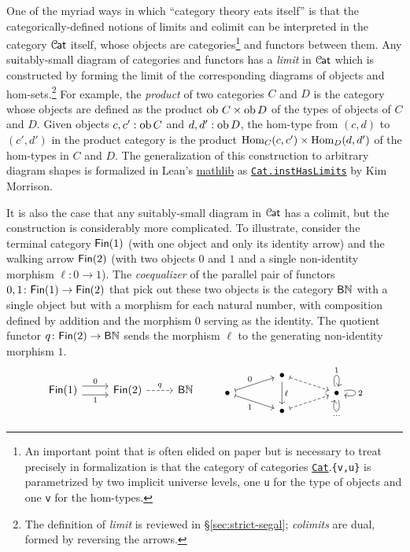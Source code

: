 \documentclass[a4paper,UKenglish,cleveref, autoref, thm-restate]{lipics-v2021}
\newcommand{\ob}{\textup{ob}}
\newcommand{\Hom}{\textup{Hom}}
\newcommand{\cat}[1]{\textup{\textsf{#1}}}%
\newcommand{\NN}{\mathbb{N}}
\newcommand{\1}{\mathbbe{1}}
\newcommand{\2}{\mathbbe{2}}
\newcommand{\3}{\mathbbe{3}}
\newcommand{\Fin}{\cat{Fin}}
\newcommand{\Cat}{\mathcal{C}{\kern-.75pt}\cat{at}}
\newcommand{\libmathlib}{\href{https://github.com/leanprover-community/mathlib}{\textsf{mathlib}}}
\newcommand{\cdoc}[2][]{\href{https://leanprover-community.github.io/mathlib4_docs/find/?pattern=CategoryTheory.#1#2\#doc}{\texttt{#2}}}
\begin{document}
One of the myriad ways in which ``category theory eats itself'' is that the categorically-defined notions of limits and colimit can be interpreted in the category $\Cat$ itself, whose objects are categories\footnote{An important point that is often elided on paper but is necessary to treat precisely in formalization is that the category of categories \cdoc{Cat}.\texttt{\{v,u\}} is parametrized by two implicit universe levels, one \texttt{u} for the type of objects and one \texttt{v} for the hom-types.} and functors between them. Any suitably-small diagram of categories and functors has a \emph{limit} in $\Cat$ which is constructed by forming the limit of the corresponding diagrams of objects and hom-sets.\footnote{The definition of \emph{limit} is reviewed in \S\ref{sec:strict-segal}; \emph{colimits} are dual, formed by reversing the arrows.} For example, the \emph{product} of two categories $C$ and $D$ is the category whose objects are defined as the product $\ob\,\,C \times \ob\,D$ of the types of objects of $C$ and $D$. Given objects $c,c' : \ob\,C$ and $d,d' : \ob\,D$, the hom-type from $(c,d)$ to $(c',d')$ in the product category is the product $\Hom_C(c,c') \times \Hom_D(d,d')$ of the hom-types in $C$ and $D$.
The generalization of this construction to arbitrary diagram shapes is formalized in Lean's \libmathlib{} as \cdoc{Cat.instHasLimits} by Kim Morrison.

It is also the case that any suitably-small diagram in $\Cat$ has a colimit, but the construction is considerably more complicated. To illustrate, consider the terminal category $\Fin(1)$ (with one object and only its identity arrow) and the walking arrow $\Fin(2)$ (with two objects $0$ and $1$ and a single non-identity morphism $\ell \colon 0 \to 1$). The \emph{coequalizer} of the parallel pair of functors $0,1 \colon \Fin(1) \to \Fin(2)$ that pick out these two objects is the category $\cat{B}\NN$ with a single object but with a morphism for each natural number, with composition defined by addition and the morphism $0$ serving as the identity. The quotient functor $q \colon \Fin(2) \to \cat{B}\NN$ sends the morphism $\ell$ to the generating non-identity morphism $1$.
\[ \begin{tikzcd} \Fin(1) \arrow[r, shift left=.4em, "0"] \arrow[r, shift right=.4em, "1"'] & \Fin(2) \arrow[r, dashed, "q"] & \cat{B}\NN \end{tikzcd}  \qquad  \begin{tikzcd}[row sep=tiny, column sep=large] & \bullet \arrow[dd, "\ell"] \arrow[dr, mapsto, dashed]\\ \bullet \arrow[ur, mapsto, "0"] \arrow[dr, mapsto, "1"'] & & \bullet  \arrow[loop above, "1"] \arrow[loop below, "\cdots"] \arrow[loop right, "2"]  \\ & \bullet \arrow[ur, mapsto, dashed]\end{tikzcd} \]
\end{document}
